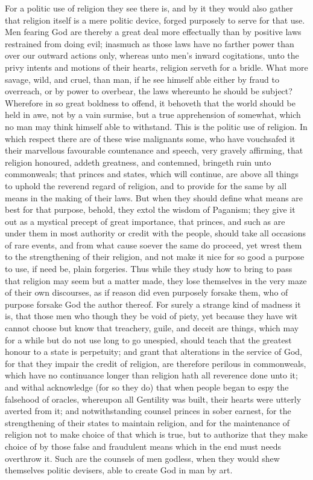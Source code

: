 For a politic use of religion they see there is, and by it they would also gather that religion itself is a mere politic device, forged purposely to serve for that use. Men  fearing God are thereby a great deal more effectually than by positive laws restrained from doing evil; inasmuch as those laws have no farther power than over our outward actions only, whereas unto men’s inward cogitations, unto the privy intents and motions of their hearts, religion serveth for a bridle. What more savage, wild, and cruel, than man, if he see himself able either by fraud to overreach, or by power to overbear, the laws whereunto he should be subject? Wherefore in so great boldness to offend, it behoveth that the world should be held in awe, not by a vain surmise, but a true apprehension of somewhat, which no man may think himself able to withstand. This is the politic use of religion.
In which respect there are of these wise malignants some, who have vouchsafed it their marvellous favourable countenance and speech, very gravely affirming, that religion honoured, addeth greatness, and contemned, bringeth ruin unto commonweals; that princes and states, which will continue, are above all things to uphold the reverend regard of religion, and to provide for the same by all means in the making of their laws.
But when they should define what means are best for that purpose, behold, they extol the wisdom of Paganism; they give it out as a mystical precept of great importance, that princes, and such as are under them in most authority or credit with the people, should take all occasions of rare events, and from what cause soever the same do proceed, yet wrest  them to the strengthening of their religion, and not make it nice for so good a purpose to use, if need be, plain forgeries. Thus while they study how to bring to pass that religion may seem but a matter made, they lose themselves in the very maze of their own discourses, as if reason did even purposely forsake them, who of purpose forsake God the author thereof. For surely a strange kind of madness it is, that those men who though they be void of piety, yet because they have wit cannot choose but know that treachery, guile, and deceit are things, which may for a while but do not use long to go unespied, should teach that the greatest honour to a state is perpetuity; and grant that alterations in the service of God, for that they impair the credit of religion, are therefore perilous in commonweals, which have no continuance longer than religion hath all reverence done unto it; and withal acknowledge (for so they do) that when people began to espy the falsehood of oracles, whereupon all Gentility was built, their hearts were utterly averted from it; and notwithstanding counsel princes in sober earnest, for the strengthening of their states to maintain religion, and for the maintenance of religion not to make choice of that which is true, but to authorize that they make choice of by those false and fraudulent means which in the end must needs overthrow it. Such are the counsels of men godless, when they would shew themselves politic devisers, able to create God in man by art.


